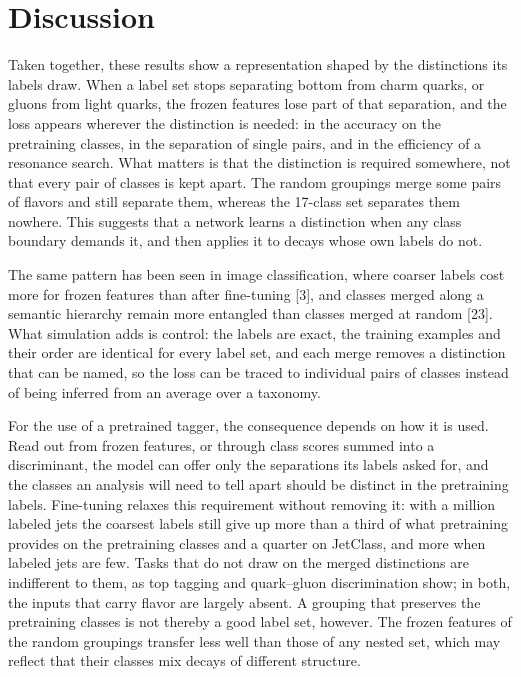 \documentclass[11pt,a4paper]{article}
\newcommand{\ct}[1]{\textcolor{black!55}{[#1]}}
\begin{document}
\section{Discussion}

Taken together, these results show a representation shaped by the distinctions its labels draw.
When a label set stops separating bottom from charm quarks, or gluons from light quarks, the
frozen features lose part of that separation, and the loss appears wherever the distinction is
needed: in the accuracy on the pretraining classes, in the separation of single pairs, and in the
efficiency of a resonance search.
What matters is that the distinction is required somewhere, not that every pair of classes is kept
apart.
The random groupings merge some pairs of flavors and still separate them, whereas the 17-class
set separates them nowhere.
This suggests that a network learns a distinction when any class boundary demands it, and then
applies it to decays whose own labels do not.

The same pattern has been seen in image classification, where coarser labels cost more for frozen
features than after fine-tuning \ct{3}, and classes merged along a semantic hierarchy remain more
entangled than classes merged at random \ct{23}.
What simulation adds is control: the labels are exact, the training examples and their order are
identical for every label set, and each merge removes a distinction that can be named, so the loss
can be traced to individual pairs of classes instead of being inferred from an average over a
taxonomy.

For the use of a pretrained tagger, the consequence depends on how it is used.
Read out from frozen features, or through class scores summed into a discriminant, the model can
offer only the separations its labels asked for, and the classes an analysis will need to tell
apart should be distinct in the pretraining labels.
Fine-tuning relaxes this requirement without removing it: with a million labeled jets the
coarsest labels still give up more than a third of what pretraining provides on the pretraining
classes and a quarter on JetClass, and more when labeled jets are few.
Tasks that do not draw on the merged distinctions are indifferent to them, as top tagging and
quark--gluon discrimination show; in both, the inputs that carry flavor are largely absent.
A grouping that preserves the pretraining classes is not thereby a good label set, however.
The frozen features of the random groupings transfer less well than those of any nested set,
which may reflect that their classes mix decays of different structure.
\end{document}
